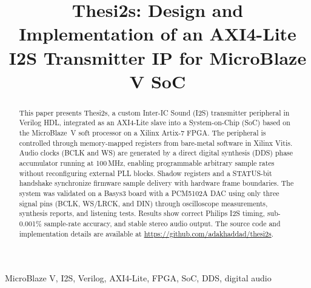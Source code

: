 \documentclass[conference,a4paper,english]{IEEEtran}[2015/08/26]
\begin{document}
\title{Thesi2s: Design and Implementation of an AXI4-Lite I2S Transmitter IP for MicroBlaze V SoC}

\author{%
}

\maketitle

\begin{abstract}
This paper presents Thesi2s, a custom Inter-IC Sound (I2S) transmitter peripheral in Verilog HDL, integrated as an AXI4-Lite slave into a System-on-Chip (SoC) based on the MicroBlaze~V soft processor on a Xilinx Artix-7 FPGA.
The peripheral is controlled through memory-mapped registers from bare-metal software in Xilinx Vitis.
Audio clocks (BCLK and WS) are generated by a direct digital synthesis (DDS) phase accumulator running at 100\,MHz, enabling programmable arbitrary sample rates without reconfiguring external PLL blocks.
Shadow registers and a STATUS-bit handshake synchronize firmware sample delivery with hardware frame boundaries.
The system was validated on a Basys3 board with a PCM5102A DAC using only three signal pins (BCLK, WS/LRCK, and DIN) through oscilloscope measurements, synthesis reports, and listening tests.
Results show correct Philips I2S timing, sub-0.001\% sample-rate accuracy, and stable stereo audio output.
The source code and implementation details are available at \url{https://github.com/adakhaddad/thesi2s}.
\end{abstract}

\begin{IEEEkeywords}
MicroBlaze V, I2S, Verilog, AXI4-Lite, FPGA, SoC, DDS, digital audio
\end{IEEEkeywords}

\IEEEpeerreviewmaketitle








\balance


\end{document}
